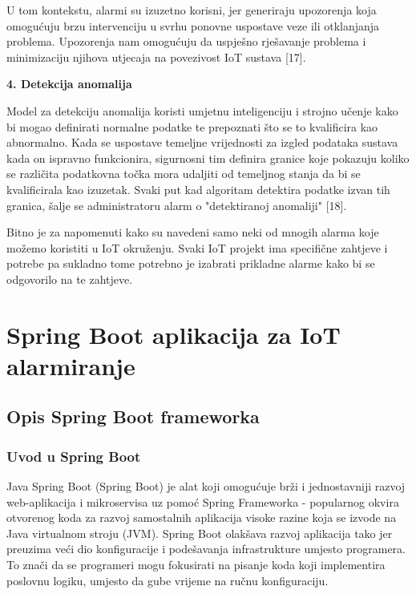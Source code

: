 \documentclass[times, utf8, zavrsni]{fer}
\begin{document}
U tom kontekstu, alarmi su izuzetno korisni, jer generiraju upozorenja koja omogućuju brzu intervenciju u svrhu ponovne uspostave veze ili otklanjanja problema. Upozorenja nam omogućuju da uspješno rješavanje problema i minimizaciju njihova utjecaja na povezivost IoT sustava [17].
\vspace{\baselineskip}

 \textbf{4. Detekcija anomalija}

 Model za detekciju anomalija koristi umjetnu inteligenciju i strojno učenje kako bi mogao definirati normalne podatke te prepoznati što se to kvalificira kao abnormalno. Kada se uspostave temeljne vrijednosti za izgled podataka sustava kada on ispravno funkcionira, sigurnosni tim definira granice koje pokazuju koliko se različita podatkovna točka mora udaljiti od temeljnog stanja da bi se kvalificirala kao izuzetak. Svaki put kad algoritam detektira podatke izvan tih granica, šalje se administratoru alarm o "detektiranoj anomaliji" [18].

\vspace{\baselineskip}

 Bitno je za napomenuti kako su navedeni samo neki od mnogih alarma koje možemo koristiti u IoT okruženju. Svaki IoT projekt ima specifične zahtjeve i potrebe pa sukladno tome potrebno je izabrati prikladne alarme kako bi se odgovorilo na te zahtjeve.


 \chapter{ Spring Boot aplikacija za IoT alarmiranje}
\section{ Opis Spring Boot frameworka}

\subsection{Uvod u Spring Boot}
Java Spring Boot (Spring Boot) je alat koji omogućuje brži i jednostavniji razvoj web-aplikacija i mikroservisa uz pomoć Spring Frameworka - popularnog okvira otvorenog koda za razvoj samostalnih aplikacija visoke razine koja se izvode na Java virtualnom stroju (JVM). Spring Boot olakšava razvoj aplikacija tako jer preuzima veći dio konfiguracije i podešavanja infrastrukture umjesto programera. To znači da se programeri mogu fokusirati na pisanje koda koji implementira poslovnu logiku, umjesto da gube vrijeme na ručnu konfiguraciju.
\end{document}
